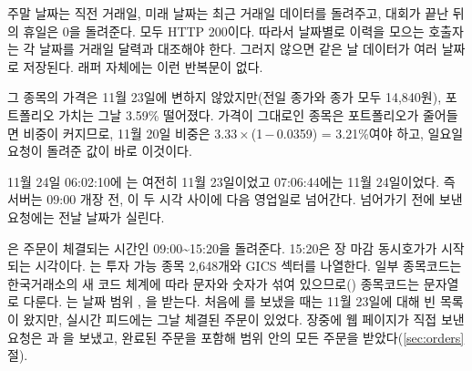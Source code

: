  주말 날짜는 직전 거래일, 미래 날짜는 최근 거래일 데이터를 돌려주고, 대회가 끝난 뒤의 휴일은 0을 돌려준다. 모두 HTTP 200이다. 따라서 날짜별로 이력을 모으는 호출자는 각 날짜를 거래일 달력과 대조해야 한다. 그러지 않으면 같은 날 데이터가 여러 날짜로 저장된다. 래퍼 자체에는 이런 반복문이 없다.



 그 종목의 가격은 11월 23일에 변하지 않았지만(전일 종가와 종가 모두 14,840원), 포트폴리오 가치는 그날 3.59\% 떨어졌다. 가격이 그대로인 종목은 포트폴리오가 줄어들면 비중이 커지므로, 11월 20일 비중은 3.33\,×\,(1\,−\,0.0359) = 3.21\%여야 하고, 일요일 요청이 돌려준 값이 바로 이것이다.

 11월 24일 06:02:10에 는 여전히 11월 23일이었고 07:06:44에는 11월 24일이었다. 즉 서버는 09:00 개장 전, 이 두 시각 사이에 다음 영업일로 넘어간다. 넘어가기 전에 보낸 요청에는 전날 날짜가 실린다.

 은 주문이 체결되는 시간인 09:00\textasciitilde 15:20을 돌려준다. 15:20은 장 마감 동시호가가 시작되는 시각이다. 는 투자 가능 종목 2,648개와 GICS 섹터를 나열한다. 일부 종목코드는 한국거래소의 새 코드 체계에 따라 문자와 숫자가 섞여 있으므로() 종목코드는 문자열로 다룬다. 는 날짜 범위 , 을 받는다. 처음에 를 보냈을 때는 11월 23일에 대해 빈 목록이 왔지만, 실시간 피드에는 그날 체결된 주문이 있었다. 장중에 웹 페이지가 직접 보낸 요청은 과 을 보냈고, 완료된 주문을 포함해 범위 안의 모든 주문을 받았다(\ref{sec:orders}절).


